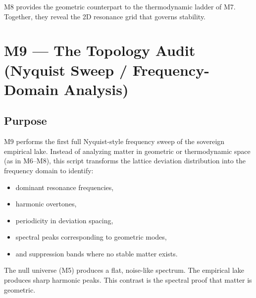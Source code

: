 \documentclass[11pt, letterpaper, openany]{book}
\begin{document}
M8 provides the geometric counterpart to the thermodynamic ladder of M7.  
Together, they reveal the 2D resonance grid that governs stability.


\section{M9 — The Topology Audit (Nyquist Sweep / Frequency-Domain Analysis)}

\subsection*{Purpose}
M9 performs the first full Nyquist-style frequency sweep of the sovereign
empirical lake. Instead of analyzing matter in geometric or thermodynamic space
(as in M6–M8), this script transforms the lattice deviation distribution into the
frequency domain to identify:

\begin{itemize}
    \item dominant resonance frequencies,
    \item harmonic overtones,
    \item periodicity in deviation spacing,
    \item spectral peaks corresponding to geometric modes,
    \item and suppression bands where no stable matter exists.
\end{itemize}

The null universe (M5) produces a flat, noise-like spectrum.  
The empirical lake produces sharp harmonic peaks.  
This contrast is the spectral proof that matter is geometric.
\end{document}
